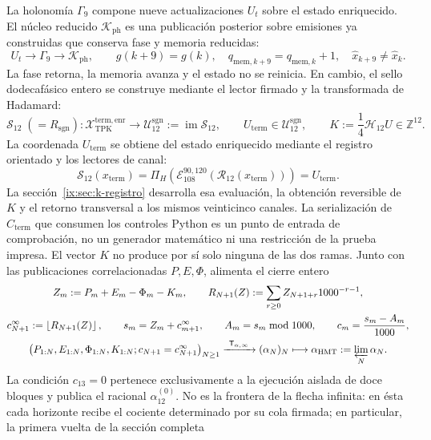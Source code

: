 La holonomía \(\Gamma_9\) compone nueve actualizaciones \(U_t\) sobre el estado
enriquecido. El núcleo reducido \(\mathcal K_{\mathrm{ph}}\) es una publicación
posterior sobre emisiones ya construidas que conserva fase y memoria reducidas:
\[
 U_t\longrightarrow\Gamma_9\longrightarrow\mathcal K_{\mathrm{ph}},
 \qquad
 g(k+9)=g(k),\quad
 q_{\mathrm{mem},k+9}=q_{\mathrm{mem},k}+1,\quad
 \widehat x_{k+9}\neq\widehat x_k.
\]
La fase retorna, la memoria avanza y el estado no se reinicia. En cambio, el
sello dodecafásico entero se construye mediante el lector firmado y la
transformada de Hadamard:
\[
 \mathcal S_{12}\;(=R_{\mathrm{sgn}}):
 \mathcal X_{\mathrm{TPK}}^{\mathrm{term,enr}}
 \longrightarrow
 \mathcal U_{12}^{\mathrm{sgn}}:=\operatorname{im}\mathcal S_{12},
 \qquad
 U_{\mathrm{term}}\in\mathcal U_{12}^{\mathrm{sgn}},
 \qquad
 K:=\frac14\mathcal H_{12}U\in\mathbb Z^{12}.
\]
La coordenada \(U_{\mathrm{term}}\) se obtiene del estado enriquecido mediante
el registro orientado y los lectores de canal:
\[
 \mathcal S_{12}(x_{\mathrm{term}})
 =\Pi_H\!\left(
   \mathcal E_{108}^{90,120}
   (\mathcal R_{12}(x_{\mathrm{term}}))\right)
 =U_{\mathrm{term}}.
\]
La sección~\ref{ix:sec:k-registro} desarrolla esa evaluación, la obtención
reversible de \(K\) y el retorno transversal a los mismos veinticinco canales.
La serialización de \(C_{\mathrm{term}}\) que consumen los controles Python es
un punto de entrada de comprobación, no un generador matemático ni una
restricción de la prueba impresa.
El vector \(K\) no produce por sí solo ninguna de las dos ramas. Junto con
las publicaciones correlacionadas \(P,E,\Phi\), alimenta el cierre entero
\[
 \begin{gathered}
 Z_m:=P_m+E_m-\Phi_m-K_m,\qquad
 R_{N+1}(Z):=\sum_{r\geq0}Z_{N+1+r}1000^{-r-1},\\
 c_{N+1}^{\infty}:=\left\lfloor R_{N+1}(Z)\right\rfloor,\qquad
 s_m=Z_m+c_{m+1}^{\infty},\qquad
 A_m=s_m\bmod1000,\qquad
 c_m=\frac{s_m-A_m}{1000},\\
 \bigl(P_{1:N},E_{1:N},\Phi_{1:N},K_{1:N};
       c_{N+1}=c_{N+1}^{\infty}\bigr)_{N\geq1}
 \xrightarrow{\ \mathsf T_{\alpha,\infty}\ }
 (\alpha_N)_N
 \longmapsto
 \alpha_{\mathrm{HMT}}:=\varprojlim_N\alpha_N.
 \end{gathered}
\]
La condición \(c_{13}=0\) pertenece exclusivamente a la ejecución aislada de
doce bloques y publica el racional \(\alpha_{12}^{(0)}\). No es la frontera
de la flecha infinita: en ésta cada horizonte recibe el cociente determinado
por su cola firmada; en particular, la primera vuelta de la sección completa
